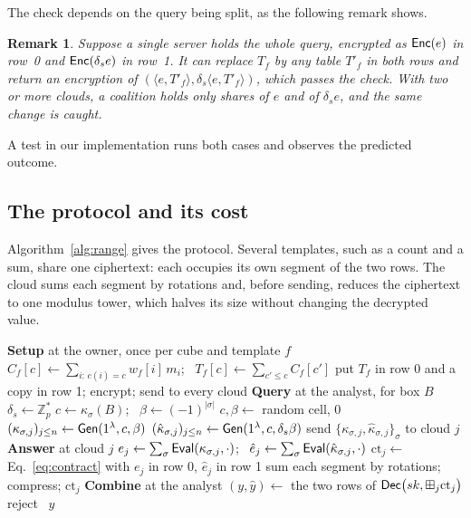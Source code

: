 \documentclass[10pt,journal,compsoc]{IEEEtran}
\newtheorem{remark}{Remark}
\begin{document}
The check depends on the query being split, as the following remark shows.

\begin{remark}
\label{rem:single}
Suppose a single server holds the whole query, encrypted as $\mathsf{Enc}(e)$ in row~0
and $\mathsf{Enc}(\delta_s e)$ in row~1. It can replace $T_f$ by any table $T'_f$ in
both rows and return an encryption of
$(\langle e,T'_f\rangle,\delta_s\langle e,T'_f\rangle)$, which passes the
check. With two or more clouds, a coalition holds only shares of $e$ and of
$\delta_s e$, and the same change is caught.
\end{remark}

A test in our implementation runs both cases and observes the predicted
outcome.

\subsection{The protocol and its cost}
\label{sec:protocol}
Algorithm~\ref{alg:range} gives the protocol. Several templates, such as a
count and a sum, share one ciphertext: each occupies its own segment of the
two rows. The cloud sums each segment by rotations and, before sending, reduces
the ciphertext to one modulus tower, which halves its size without changing
the decrypted value.

\begin{algorithm}[t]
\caption{Checked range query on a registered cube.}
\label{alg:range}
\begin{algorithmic}[1]
\Statex \textbf{Setup} at the owner, once per cube and template $f$
\State $C_f[c]\gets\sum_{i:\,c(i)=c}w_f[i]\,m_i$; \ $T_f[c]\gets\sum_{c'\le c}C_f[c']$
\State put $T_f$ in row 0 and a copy in row 1; encrypt; send to every cloud
\Statex \textbf{Query} at the analyst, for box $B$
\State $\delta_s\gets\mathbb{Z}_p^{*}$ 
  \State $c\gets\kappa_\sigma(B)$; \ $\beta\gets(-1)^{|\sigma|}$
   $c,\beta\gets$ random cell, $0$ \EndIf
  \State $(\kappa_{\sigma,j})_{j\le n}\gets\mathsf{Gen}(1^\lambda,c,\beta)$
  \State $(\hat\kappa_{\sigma,j})_{j\le n}\gets\mathsf{Gen}(1^\lambda,c,\delta_s\beta)$
\EndFor
\State send $\{\kappa_{\sigma,j},\hat\kappa_{\sigma,j}\}_\sigma$ to cloud $j$
\Statex \textbf{Answer} at cloud $j$
\State $e_j\gets\sum_\sigma\mathsf{Eval}(\kappa_{\sigma,j},\cdot)$; \ $\hat e_j\gets\sum_\sigma\mathsf{Eval}(\hat\kappa_{\sigma,j},\cdot)$
\State $\mathrm{ct}_j\gets$ Eq.~\eqref{eq:contract} with $e_j$ in row 0, $\hat e_j$ in row 1
\State sum each segment by rotations; compress; \Return $\mathrm{ct}_j$
\Statex \textbf{Combine} at the analyst
\State $(y,\hat y)\gets$ the two rows of $\mathsf{Dec}\big(sk,\boxplus_j\mathrm{ct}_j\big)$
 reject \Else\ \Return $y$ \EndIf
\end{algorithmic}
\end{algorithm}
\end{document}
